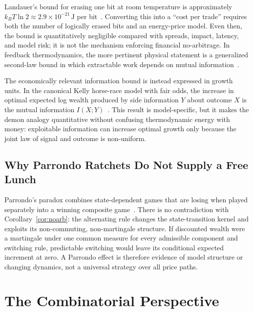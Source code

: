 \documentclass[aps,pra,reprint,superscriptaddress,amsmath,amssymb,floatfix]{revtex4-2}
\theoremstyle{plain}
\theoremstyle{definition}
\theoremstyle{remark}
\begin{document}
Landauer's bound for erasing one bit at room temperature is approximately
\(k_BT\ln2\approx2.9\times10^{-21}\,\mathrm{J}\)
per bit~\cite{landauer:61,bennett-82}. Converting this into a ``cost per
trade'' requires both the number of logically erased bits and an energy-price
model. Even then, the bound is quantitatively negligible compared with
spreads, impact, latency, and model risk; it is not the mechanism enforcing
financial no-arbitrage. In feedback thermodynamics, the more pertinent physical
statement is a generalized second-law bound in which extractable work depends
on mutual information~\cite{SagawaUeda2008,Sagawa2012}.

The economically relevant information bound is instead expressed in growth
units. In the canonical Kelly horse-race model with fair odds, the increase in
optimal expected log wealth produced by side information \(Y\) about outcome
\(X\) is the mutual information \(I(X;Y)\)~\cite{Kelly1956}. This result is
model-specific, but it makes the demon analogy quantitative without confusing
thermodynamic energy with money: exploitable information can increase optimal
growth only because the joint law of signal and outcome is non-uniform.

\subsection{Why Parrondo Ratchets Do Not Supply a Free Lunch}

Parrondo's paradox combines state-dependent games that are losing when played
separately into a winning composite game~\cite{HarmerAbbott1999}. There is no
contradiction with Corollary~\ref{cor:noarb}: the alternating rule changes the
state-transition kernel and exploits its non-commuting, non-martingale
structure. If discounted wealth were a martingale under one common measure for
every admissible component and switching rule, predictable switching would
leave its conditional expected increment at zero. A Parrondo effect is
therefore evidence of model structure or changing dynamics, not a universal
strategy over all price paths.

\section{The Combinatorial Perspective}
\label{sec:nfl}
\end{document}
